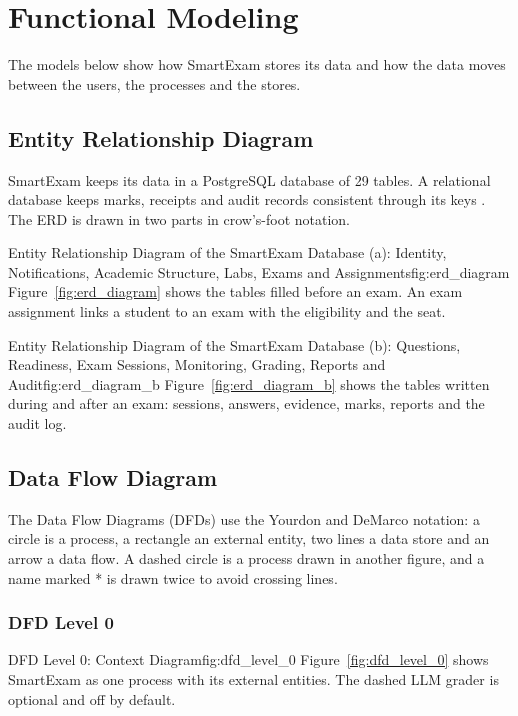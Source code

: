 \section{Functional Modeling}

The models below show how SmartExam stores its data and how the data moves between the users, the processes and the stores.

\subsection{Entity Relationship Diagram}

SmartExam keeps its data in a PostgreSQL database of 29 tables. A relational database keeps marks, receipts and audit records consistent through its keys \cite{elmasri2016}. The ERD is drawn in two parts in crow's-foot notation.

%
{Entity Relationship Diagram of the SmartExam Database (a): Identity, Notifications, Academic Structure, Labs, Exams and Assignments}{fig:erd_diagram}%
{Figure~\ref{fig:erd_diagram} shows the tables filled before an exam. An exam assignment links a student to an exam with the eligibility and the seat.}

%
{Entity Relationship Diagram of the SmartExam Database (b): Questions, Readiness, Exam Sessions, Monitoring, Grading, Reports and Audit}{fig:erd_diagram_b}%
{Figure~\ref{fig:erd_diagram_b} shows the tables written during and after an exam: sessions, answers, evidence, marks, reports and the audit log.}

\subsection{Data Flow Diagram}

The Data Flow Diagrams (DFDs) use the Yourdon and DeMarco notation: a circle is a process, a rectangle an external entity, two lines a data store and an arrow a data flow. A dashed circle is a process drawn in another figure, and a name marked * is drawn twice to avoid crossing lines.

\subsubsection{DFD Level 0}
%
{DFD Level 0: Context Diagram}{fig:dfd_level_0}%
{Figure~\ref{fig:dfd_level_0} shows SmartExam as one process with its external entities. The dashed LLM grader is optional and off by default.}

